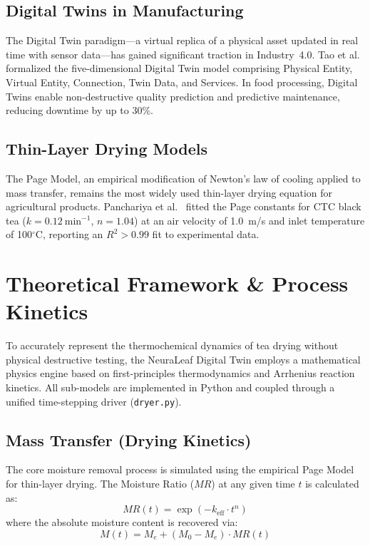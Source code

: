 ﻿\documentclass[12pt, a4paper]{report}
\begin{document}
\section{Digital Twins in Manufacturing}
The Digital Twin paradigm---a virtual replica of a physical asset updated in real time with sensor data---has gained significant traction in Industry~4.0. Tao et al.\ \cite{ref_dt} formalized the five-dimensional Digital Twin model comprising Physical Entity, Virtual Entity, Connection, Twin Data, and Services. In food processing, Digital Twins enable non-destructive quality prediction and predictive maintenance, reducing downtime by up to 30\%.

\section{Thin-Layer Drying Models}
The Page Model, an empirical modification of Newton's law of cooling applied to mass transfer, remains the most widely used thin-layer drying equation for agricultural products. Panchariya et al.\ \cite{ref_page} fitted the Page constants for CTC black tea ($k = 0.12~\text{min}^{-1}$, $n = 1.04$) at an air velocity of 1.0~m/s and inlet temperature of 100$^\circ$C, reporting an $R^2 > 0.99$ fit to experimental data.


\chapter{Theoretical Framework \& Process Kinetics}
To accurately represent the thermochemical dynamics of tea drying without physical destructive testing, the NeuraLeaf Digital Twin employs a mathematical physics engine based on first-principles thermodynamics and Arrhenius reaction kinetics. All sub-models are implemented in Python and coupled through a unified time-stepping driver (\texttt{dryer.py}).

\section{Mass Transfer (Drying Kinetics)}
The core moisture removal process is simulated using the empirical Page Model for thin-layer drying. The Moisture Ratio ($MR$) at any given time $t$ is calculated as:
\begin{equation}
MR(t) = \exp(-k_{\text{eff}} \cdot t^n)
\label{eq:page}
\end{equation}
where the absolute moisture content is recovered via:
\begin{equation}
M(t) = M_e + (M_0 - M_e) \cdot MR(t)
\end{equation}
\end{document}
